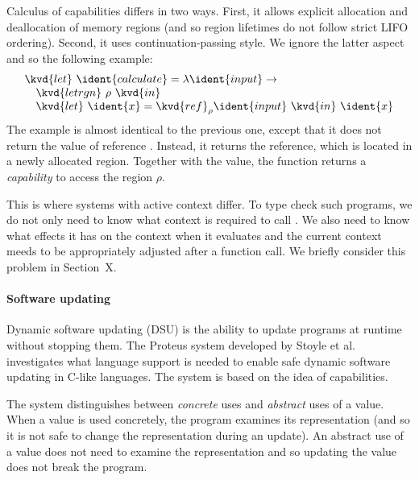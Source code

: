 Calculus of capabilities differs in two ways. First, it allows explicit allocation and deallocation
of memory regions (and so region lifetimes do not follow strict LIFO ordering). Second, it
uses continuation-passing style. We ignore the latter aspect and so the following example:
%
\begin{equation*}
\begin{array}{l}
\kvd{let}~\ident{calculate} = \lambda \ident{input} \rightarrow\\
\quad \kvd{letrgn}~\rho~\kvd{in}\\
\quad \kvd{let}~\ident{x} = \kvd{ref}_\rho \ident{input}~\kvd{in}~\ident{x}
\end{array}
\end{equation*}
%
The example is almost identical to the previous one, except that it does not return the value
of reference . Instead, it returns the reference, which is located in a newly allocated
region. Together with the value, the function returns a \emph{capability} to access the region
$\rho$.

This is where systems with active context differ. To type check such programs, we do not only need
to know what context is required to call . We also need to know what effects it
has on the context when it evaluates and the current context meeds to be appropriately adjusted
after a function call. We briefly consider this problem in Section~X. %


\paragraph{Software updating}
Dynamic software updating (DSU) \cite{app-dsu-programs,app-dsu} is the ability to update programs at
runtime without stopping them. The Proteus system developed by Stoyle et al. \cite{app-dsu-mutatis} 
investigates what language support is needed to enable safe dynamic software updating in C-like 
languages. The system is based on the idea of capabilities.

The system distinguishes between \emph{concrete} uses and \emph{abstract} uses of a value. When
a value is used concretely, the program examines its representation (and so it is not safe to
change the representation during an update). An abstract use of a value does not need to examine
the representation and so updating the value does not break the program.

